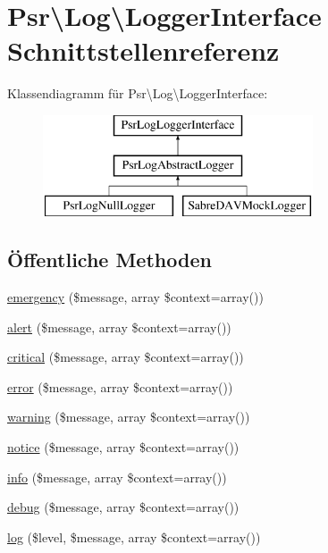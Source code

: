 \hypertarget{interface_psr_1_1_log_1_1_logger_interface}{}\section{Psr\textbackslash{}Log\textbackslash{}Logger\+Interface Schnittstellenreferenz}
\label{interface_psr_1_1_log_1_1_logger_interface}
Klassendiagramm für Psr\textbackslash{}Log\textbackslash{}Logger\+Interface\+:\begin{figure}[H]
\begin{center}
\leavevmode
\includegraphics[height=3.000000cm]{interface_psr_1_1_log_1_1_logger_interface}
\end{center}
\end{figure}
\subsection*{Öffentliche Methoden}
\begin{DoxyCompactItemize}
\item 
\mbox{\hyperlink{interface_psr_1_1_log_1_1_logger_interface_a274d0a800dac32d011d4a441d1fe5680}{emergency}} (\$message, array \$context=array())
\item 
\mbox{\hyperlink{interface_psr_1_1_log_1_1_logger_interface_a957d0328d4e0ebc013b8df027148d2bf}{alert}} (\$message, array \$context=array())
\item 
\mbox{\hyperlink{interface_psr_1_1_log_1_1_logger_interface_a83e55a657304050b536411399b93f128}{critical}} (\$message, array \$context=array())
\item 
\mbox{\hyperlink{interface_psr_1_1_log_1_1_logger_interface_a98c3f600f3f01f5d5afe9cb3057c735c}{error}} (\$message, array \$context=array())
\item 
\mbox{\hyperlink{interface_psr_1_1_log_1_1_logger_interface_a3f8f3287b007ef73738d81e0ffd8127f}{warning}} (\$message, array \$context=array())
\item 
\mbox{\hyperlink{interface_psr_1_1_log_1_1_logger_interface_a230d886d26128d4e8ccba1de42b686ab}{notice}} (\$message, array \$context=array())
\item 
\mbox{\hyperlink{interface_psr_1_1_log_1_1_logger_interface_ad653b1161ba33b54bdfb63e7848e8dd8}{info}} (\$message, array \$context=array())
\item 
\mbox{\hyperlink{interface_psr_1_1_log_1_1_logger_interface_a5659ed2af93e0152981f3c0cee8c329e}{debug}} (\$message, array \$context=array())
\item 
\mbox{\hyperlink{interface_psr_1_1_log_1_1_logger_interface_a10d23c9a1cf2d5dca305285efb7e3c0d}{log}} (\$level, \$message, array \$context=array())
\end{DoxyCompactItemize}


